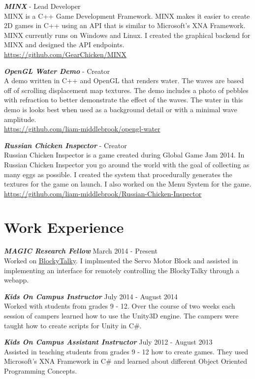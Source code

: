 \documentclass[line,margin]{res}
\begin{document}
\begin{resume}
{\textbf{\emph{MINX}}} - Lead Developer\\
MINX is a C++ Game Development Framework. MINX makes it easier to create 2D games in C++ using an API
that is similar to Microsoft's XNA Framework. MINX currently runs on Windows and Linux. I created the
graphical backend for MINX and designed the API endpoints.\\
\url{https://github.com/GearChicken/MINX}

{\textbf{\emph{OpenGL Water Demo}}} - Creator\\
A demo written in C++ and OpenGL that renders water. The waves are based off of scrolling displacement
map textures. The demo includes a photo of pebbles with refraction to better demonstrate the effect
of the waves. The water in this demo is looks best when used as a background detail or with a minimal
wave amplitude.\\
\url{https://github.com/liam-middlebrook/opengl-water}

{\textbf{\emph{Russian Chicken Inspector}}} - Creator\\
Russian Chicken Inspector is a game created during Global Game Jam 2014. In Russian Chicken Inspector
you go around the world with the goal of collecting as many eggs as possible. I created the system
that procedurally generates the textures for the game on launch. I also worked on the Menu System for the game.\\
\url {https://github.com/liam-middlebrook/Russian-Chicken-Inspector}


\section{Work Experience}

{\textbf{\emph{MAGIC Research Fellow}}} \hfill March 2014 - Present\\
Worked on \href{https://github.com/liam-middlebrook/blockytalky.git}{BlockyTalky}. I implmented
the Servo Motor Block and assisted in implementing an interface for remotely controlling the 
BlockyTalky through a webapp.

{\textbf{\emph{Kids On Campus Instructor}}} \hfill July 2014 - August 2014\\
Worked with students from grades 9 - 12. Over the course of two weeks each session of campers
learned how to use the Unity3D engine. The campers were taught how to create scripts for Unity
in C\#.

{\textbf{\emph{Kids On Campus Assistant Instructor}}} \hfill July 2012 - August 2013\\
Assisted in teaching students from grades 9 - 12 how to create games. They used Microsoft's 
XNA Framework in C\# and learned about different Object Oriented Programming Concepts.



\end{resume}
\end{document}
